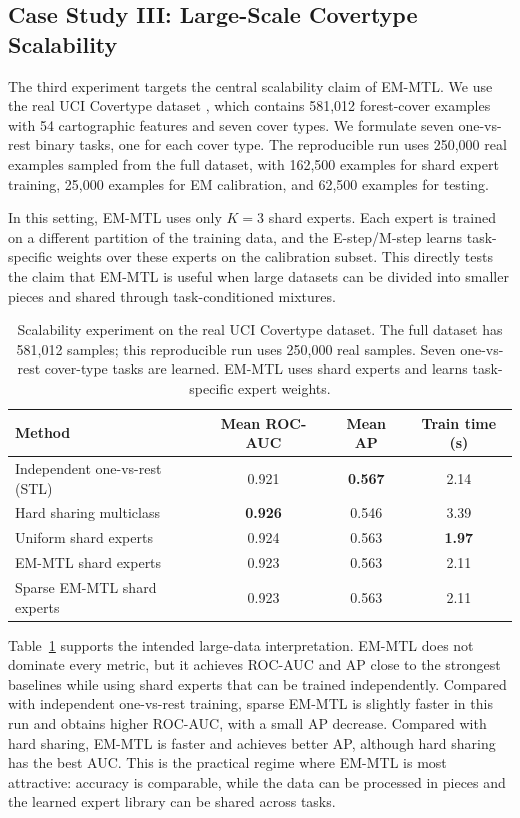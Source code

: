 \documentclass[preprint,12pt]{elsarticle}
\begin{document}
	\subsection{Case Study III: Large-Scale Covertype Scalability}
	
	The third experiment targets the central scalability claim of EM-MTL.
	We use the real UCI Covertype dataset \citep{blackard1998covertype},
	which contains 581,012 forest-cover examples with 54 cartographic
	features and seven cover types. We formulate seven one-vs-rest binary
	tasks, one for each cover type. The reproducible run uses 250,000 real
	examples sampled from the full dataset, with 162,500 examples for shard
	expert training, 25,000 examples for EM calibration, and 62,500 examples
	for testing.
	
	In this setting, EM-MTL uses only $K=3$ shard experts. Each expert is
	trained on a different partition of the training data, and the E-step/M-step
	learns task-specific weights over these experts on the calibration
	subset. This directly tests the claim that EM-MTL is useful when
	large datasets can be divided into smaller pieces and shared through
	task-conditioned mixtures.
	
	\begin{table}[t]
		\centering
		\caption{Scalability experiment on the real UCI Covertype dataset. The
			full dataset has 581,012 samples; this reproducible run uses 250,000
			real samples. Seven one-vs-rest cover-type tasks are learned. EM-MTL
			uses shard experts and learns task-specific expert weights.}
		\label{tab:covtype_scalability}
		\begin{tabular}{lccc}
			\toprule
			Method & Mean ROC-AUC & Mean AP & Train time (s) \\
			\midrule
			Independent one-vs-rest (STL) & 0.921 & \textbf{0.567} & 2.14 \\
			Hard sharing multiclass & \textbf{0.926} & 0.546 & 3.39 \\
			Uniform shard experts & 0.924 & 0.563 & \textbf{1.97} \\
			EM-MTL shard experts & 0.923 & 0.563 & 2.11 \\
			Sparse EM-MTL shard experts & 0.923 & 0.563 & 2.11 \\
			\bottomrule
		\end{tabular}
	\end{table}
	
	Table~\ref{tab:covtype_scalability} supports the intended large-data
	interpretation. EM-MTL does not dominate every metric, but it achieves
	ROC-AUC and AP close to the strongest baselines while using shard experts
	that can be trained independently. Compared with independent one-vs-rest
	training, sparse EM-MTL is slightly faster in this run and obtains higher
	ROC-AUC, with a small AP decrease. Compared with hard sharing, EM-MTL is
	faster and achieves better AP, although hard sharing has the best AUC.
	This is the practical regime where EM-MTL is most attractive: accuracy
	is comparable, while the data can be processed in pieces and the learned
	expert library can be shared across tasks.
	
\end{document}
